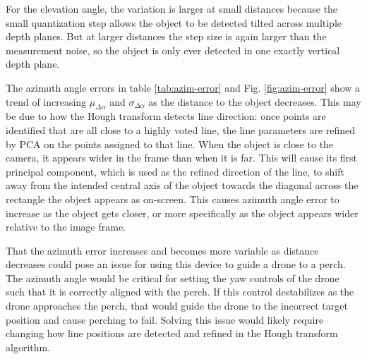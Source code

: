 For the elevation angle, the variation is larger at small distances because the 
small quantization step allows the object to be detected tilted across multiple depth planes. But at larger distances the step size is
again larger than the measurement noise, so the object is only ever detected in one exactly vertical depth plane.

The azimuth angle errors in table \ref{tab:azim-error} and Fig. \ref{fig:azim-error} show a trend of increasing $\mu_{\Delta \alpha}$ 
and  $\sigma_{\Delta \alpha}$  as the distance to the object decreases.
This may be due to how the Hough transform detects line direction: once points are identified that are all close to a highly voted line,
the line parameters are refined by PCA on the points assigned to that line. When the object is close to the camera, it appears
wider in the frame than when it is far. This will cause its first principal component, which is used as the refined direction
of the line, to shift away from the intended central axis of the object towards the diagonal across the rectangle the object appears
as on-screen. This causes azimuth angle error to increase as the object gets closer, or more specifically as the object appears wider
relative to the image frame.

That the azimuth error increases and becomes more variable as distance decreases could pose an issue for using this device to guide a drone
to a perch. The azimuth angle would be critical for setting the yaw controls of the drone such that it is correctly aligned with the perch.
If this control destabilizes as the drone approaches the perch, that would guide the drone to the incorrect target position and cause perching 
to fail. Solving this issue would likely require changing how line positions are detected and refined in the Hough transform algorithm.


